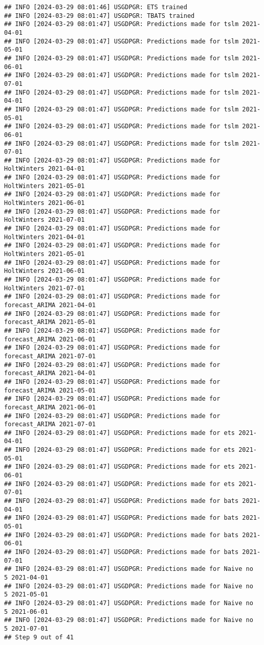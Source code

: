 \documentclass[
]{article}
\begin{document}
\begin{verbatim}
## INFO [2024-03-29 08:01:46] USGDPGR: ETS trained
## INFO [2024-03-29 08:01:47] USGDPGR: TBATS trained
## INFO [2024-03-29 08:01:47] USGDPGR: Predictions made for tslm 2021-04-01
## INFO [2024-03-29 08:01:47] USGDPGR: Predictions made for tslm 2021-05-01
## INFO [2024-03-29 08:01:47] USGDPGR: Predictions made for tslm 2021-06-01
## INFO [2024-03-29 08:01:47] USGDPGR: Predictions made for tslm 2021-07-01
## INFO [2024-03-29 08:01:47] USGDPGR: Predictions made for tslm 2021-04-01
## INFO [2024-03-29 08:01:47] USGDPGR: Predictions made for tslm 2021-05-01
## INFO [2024-03-29 08:01:47] USGDPGR: Predictions made for tslm 2021-06-01
## INFO [2024-03-29 08:01:47] USGDPGR: Predictions made for tslm 2021-07-01
## INFO [2024-03-29 08:01:47] USGDPGR: Predictions made for HoltWinters 2021-04-01
## INFO [2024-03-29 08:01:47] USGDPGR: Predictions made for HoltWinters 2021-05-01
## INFO [2024-03-29 08:01:47] USGDPGR: Predictions made for HoltWinters 2021-06-01
## INFO [2024-03-29 08:01:47] USGDPGR: Predictions made for HoltWinters 2021-07-01
## INFO [2024-03-29 08:01:47] USGDPGR: Predictions made for HoltWinters 2021-04-01
## INFO [2024-03-29 08:01:47] USGDPGR: Predictions made for HoltWinters 2021-05-01
## INFO [2024-03-29 08:01:47] USGDPGR: Predictions made for HoltWinters 2021-06-01
## INFO [2024-03-29 08:01:47] USGDPGR: Predictions made for HoltWinters 2021-07-01
## INFO [2024-03-29 08:01:47] USGDPGR: Predictions made for forecast_ARIMA 2021-04-01
## INFO [2024-03-29 08:01:47] USGDPGR: Predictions made for forecast_ARIMA 2021-05-01
## INFO [2024-03-29 08:01:47] USGDPGR: Predictions made for forecast_ARIMA 2021-06-01
## INFO [2024-03-29 08:01:47] USGDPGR: Predictions made for forecast_ARIMA 2021-07-01
## INFO [2024-03-29 08:01:47] USGDPGR: Predictions made for forecast_ARIMA 2021-04-01
## INFO [2024-03-29 08:01:47] USGDPGR: Predictions made for forecast_ARIMA 2021-05-01
## INFO [2024-03-29 08:01:47] USGDPGR: Predictions made for forecast_ARIMA 2021-06-01
## INFO [2024-03-29 08:01:47] USGDPGR: Predictions made for forecast_ARIMA 2021-07-01
## INFO [2024-03-29 08:01:47] USGDPGR: Predictions made for ets 2021-04-01
## INFO [2024-03-29 08:01:47] USGDPGR: Predictions made for ets 2021-05-01
## INFO [2024-03-29 08:01:47] USGDPGR: Predictions made for ets 2021-06-01
## INFO [2024-03-29 08:01:47] USGDPGR: Predictions made for ets 2021-07-01
## INFO [2024-03-29 08:01:47] USGDPGR: Predictions made for bats 2021-04-01
## INFO [2024-03-29 08:01:47] USGDPGR: Predictions made for bats 2021-05-01
## INFO [2024-03-29 08:01:47] USGDPGR: Predictions made for bats 2021-06-01
## INFO [2024-03-29 08:01:47] USGDPGR: Predictions made for bats 2021-07-01
## INFO [2024-03-29 08:01:47] USGDPGR: Predictions made for Naive no  5 2021-04-01
## INFO [2024-03-29 08:01:47] USGDPGR: Predictions made for Naive no  5 2021-05-01
## INFO [2024-03-29 08:01:47] USGDPGR: Predictions made for Naive no  5 2021-06-01
## INFO [2024-03-29 08:01:47] USGDPGR: Predictions made for Naive no  5 2021-07-01
## Step 9 out of 41
\end{verbatim}
\end{document}
